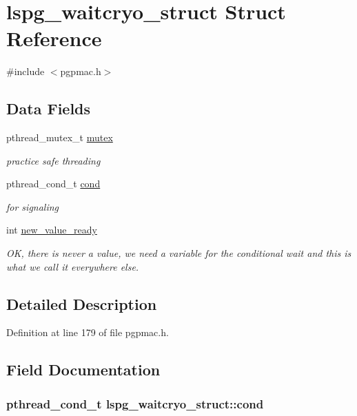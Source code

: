 \hypertarget{structlspg__waitcryo__struct}{\section{lspg\-\_\-waitcryo\-\_\-struct Struct Reference}
\label{structlspg__waitcryo__struct}
}


{\ttfamily \#include $<$pgpmac.\-h$>$}

\subsection*{Data Fields}
\begin{DoxyCompactItemize}
\item 
pthread\-\_\-mutex\-\_\-t \hyperlink{structlspg__waitcryo__struct_a62b50ead380fc8a6be35956eba384ba6}{mutex}
\begin{DoxyCompactList}\small\item\em practice safe threading \end{DoxyCompactList}\item 
pthread\-\_\-cond\-\_\-t \hyperlink{structlspg__waitcryo__struct_a54c275159d9f096e0d1884e64d099298}{cond}
\begin{DoxyCompactList}\small\item\em for signaling \end{DoxyCompactList}\item 
int \hyperlink{structlspg__waitcryo__struct_a97298b773fd8c1f2ef20159093a08246}{new\-\_\-value\-\_\-ready}
\begin{DoxyCompactList}\small\item\em O\-K, there is never a value, we need a variable for the conditional wait and this is what we call it everywhere else. \end{DoxyCompactList}\end{DoxyCompactItemize}


\subsection{Detailed Description}


Definition at line 179 of file pgpmac.\-h.



\subsection{Field Documentation}
\hypertarget{structlspg__waitcryo__struct_a54c275159d9f096e0d1884e64d099298}{
\subsubsection[{cond}]{\setlength{\rightskip}{0pt plus 5cm}pthread\-\_\-cond\-\_\-t lspg\-\_\-waitcryo\-\_\-struct\-::cond}}\label{structlspg__waitcryo__struct_a54c275159d9f096e0d1884e64d099298}



